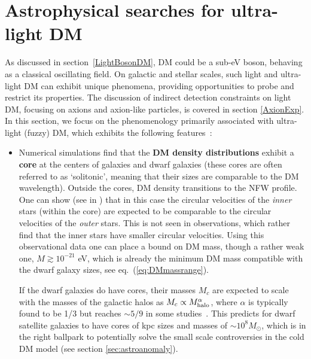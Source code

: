 \section{Astrophysical searches for ultra-light DM}\label{sec:UDM:indirect}
As discussed in section~\ref{LightBosonDM}, DM could be a sub-eV boson, behaving as a classical oscillating field. 
On galactic and stellar scales, such light and ultra-light DM can exhibit unique phenomena, 
providing opportunities to probe and restrict its properties. 
 The discussion of indirect detection constraints on light DM, focusing on axions and axion-like particles, is covered in section \ref{AxionExp}. 
In this section, we focus on the phenomenology primarily associated with ultra-light (fuzzy) DM, 
which exhibits the following features~\cite{FuzzyDMbounds}:
\begin{itemize}
\item[$\circ$] 
Numerical simulations find that the {\bf DM density distributions} exhibit a {\bf core} 
at the centers of galaxies and dwarf galaxies (these cores are often referred to as `solitonic', meaning that their sizes are comparable to the DM wavelength). 
Outside the cores, DM density transitions to the NFW profile. 
One can show (see  in \cite{FuzzyDMbounds}) that in this case the circular velocities of the {\em inner} stars (within the core) are expected to be comparable to the circular velocities of the {\em outer} stars. This is not seen in observations, which rather find that the inner stars have smaller circular velocities.
Using this observational data one can place a bound  on DM mass, though a rather weak one, $M \gtrsim 10^{-21}$ eV, which is already the minimum DM mass compatible with the dwarf galaxy sizes, see eq.~(\ref{eq:DMmassrange}). 

If the dwarf galaxies do have cores, their masses $M_c$ are expected to scale with the masses of the galactic halos 
as $M_c\propto M_{\rm halo}^{\alpha}$, where $\alpha$ is typically found to be 1/3 but reaches $\sim 5/9$ in some studies~\cite{FuzzyDMbounds}. 
This predicts for dwarf satellite galaxies to have cores of kpc sizes  and masses of $\sim 10^8M_\odot$, which is in the right ballpark to potentially solve the small scale controversies in the cold DM model (see section \ref{sec:astroanomaly}).



\end{itemize}
